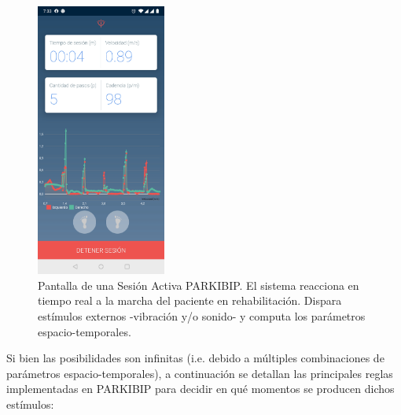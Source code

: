 \begin{figure}[H]
 \centering
 \includegraphics[height=9cm]{TESIS/imagenes/chap05/activity-active-session.JPG}
 \caption{Pantalla de una Sesión Activa PARKIBIP. El sistema reacciona en tiempo real a la marcha del paciente en rehabilitación. Dispara estímulos externos -vibración y/o sonido- y computa los parámetros espacio-temporales.}
 \label{fig:activity-active-session}
\end{figure}

Si bien las posibilidades son infinitas (i.e. debido a múltiples combinaciones de parámetros espacio-temporales), a continuación se detallan las principales reglas implementadas en PARKIBIP para decidir en qué momentos se producen dichos estímulos:

